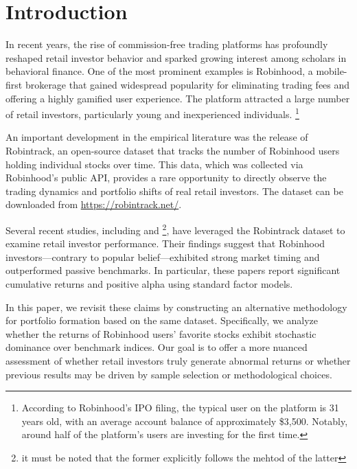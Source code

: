 \section{Introduction}

In recent years, the rise of commission-free trading platforms has profoundly reshaped retail investor behavior and sparked growing interest among scholars in behavioral finance. 
One of the most prominent examples is Robinhood, a mobile-first brokerage that gained widespread popularity for eliminating trading fees and offering a highly gamified user experience. 
The platform attracted a large number of retail investors, particularly young and inexperienced individuals.
\footnote{According to Robinhood’s IPO filing, the typical user on the platform is 31 years old, with an average account balance of approximately \$3,500. Notably, around half of the platform’s users are investing for the first time.}

An important development in the empirical literature was the release of Robintrack, an open-source dataset that tracks the number of Robinhood users holding individual stocks over time. 
This data, which was collected via Robinhood's public API, provides a rare opportunity to directly observe the trading dynamics and portfolio shifts of real retail investors. 
The dataset can be downloaded from \url{https://robintrack.net/}.

Several recent studies, including \cite{Fedyk2024} and \cite{Welch2022}\footnote{it must be noted that the former explicitly follows the mehtod of the latter}, 
have leveraged the Robintrack dataset to examine retail investor performance. 
Their findings suggest that Robinhood investors—contrary to popular belief—exhibited strong market timing and outperformed passive benchmarks. 
In particular, these papers report significant cumulative returns and positive alpha using standard factor models.

In this paper, we revisit these claims by constructing an alternative methodology for portfolio formation based on the same dataset. 
Specifically, we analyze whether the returns of Robinhood users’ favorite stocks exhibit stochastic dominance over benchmark indices.
Our goal is to offer a more nuanced assessment of whether retail investors truly generate abnormal returns or whether previous results may be driven by sample selection or methodological choices.